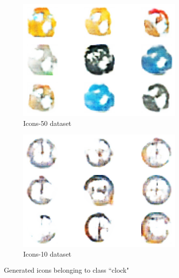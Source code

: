 \documentclass[conference]{IEEEtran}
\begin{document}
\begin{figure}[htbp]
    \begin{subfigure}[h]{0.4\linewidth}
        \includegraphics[width=\linewidth]{paper/images/gen_icons/icons50_clock.png}
        \caption{Icons-50 dataset}
        \label{fig:Icons50Clock}
    \end{subfigure}
    \hfill
    \begin{subfigure}[h]{0.4\linewidth}
        \includegraphics[width=\linewidth]{paper/images/gen_icons/icons10_clock.png}
        \caption{Icons-10 dataset}
        \label{fig:Icons10Clock}
    \end{subfigure}
    \caption{Generated icons belonging to class ``clock"}
    \label{fig:ClockIcons}
\end{figure}
\end{document}
